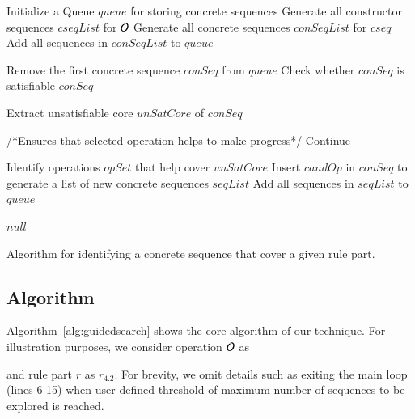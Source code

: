 \begin{algorithm}[t]
\footnotesize
\SetAlgoVlined
{}
\BlankLine

\nl Initialize a Queue $queue$ for storing concrete sequences\;
\nl Generate all constructor sequences $cseqList$ for ${\cal O}$\;
\nl {}
{
		\nl Generate all concrete sequences $conSeqList$ for $cseq$\;
		\nl Add all sequences in $conSeqList$ to $queue$\;
} 

\nl {}
{
		\nl Remove the first concrete sequence $conSeq$ from $queue$\;
		\nl Check whether $conSeq$ is satisfiable\;
		\nl {}
		{
				\Return $conSeq$ \;
		}
		
		\nl Extract unsatisfiable core $unSatCore$ of $conSeq$\;
		
		/*Ensures that selected operation helps to make progress*/
		\nl {}
		{
				Continue\;
		}
		
		\nl Identify operations $opSet$ that help cover $unSatCore$\;		
		\nl {}
		{
			\nl Insert $candOp$ in $conSeq$ to generate a list of new concrete sequences $seqList$\;
			\nl Add all sequences in $seqList$ to $queue$\;			
		}
}

\Return $null$\;
		
\caption{\label{alg:guidedsearch} Algorithm for
  identifying a concrete sequence that cover a given rule part.}
\end{algorithm}



\subsection{Algorithm}
\label{sec:technique}

Algorithm~\ref{alg:guidedsearch} shows the core algorithm of our technique. For illustration
purposes, we consider operation ${\cal O}$ as \subject{GenerateInvoice} and 
rule part $r$ as $r_{4.2}$. For brevity,
we omit details such as exiting the main loop (lines 6-15) when user-defined
threshold of maximum number of sequences to be explored is reached.


